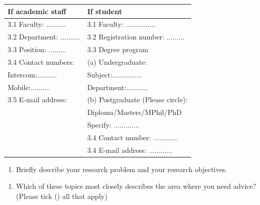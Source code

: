 \documentclass[
  a4paper]{article}
\providecommand{\tightlist}{%
  \setlength{\itemsep}{0pt}\setlength{\parskip}{0pt}}
\begin{document}
\begin{table}[!h]
\center
\begin{tabular}{p{7cm}|p{7.5cm}}
\hline
If academic staff & If student \\ \hline
3.1 Faculty: .......... & 3.1 Faculty: ...............  \\ 
3.2 Department: .......... & 3.2 Registration number: ......... \\ 
3.3 Position: ......... & 3.3 Degree program \\ 
3.4 Contact numbers: & \hspace{0.5cm} (a) Undergraduate: \\ 
\hspace{0.8cm} Intercom:.......... & \hspace{0.8cm} Subject:............... \\ 
\hspace{0.8cm} Mobile:.......... & \hspace{0.8cm} Department:........... \\ 
3.5 E-mail address:  & \hspace{0.5cm} (b) Postgraduate (Please circle): \\ 
 & \hspace{0.8cm} Diploma/Masters/MPhil/PhD \\ 
 & \hspace{0.8cm} Specify: ............. \\ 
  & 3.4 Contact number: ............  \\ 
  & 3.4 E-mail address: ............  \\ \hline
\end{tabular}
\end{table}

\begin{enumerate}
\def\labelenumi{\arabic{enumi}.}
\setcounter{enumi}{3}
\tightlist
\item
  Briefly describe your research problem and your research objectives.
\end{enumerate}

\newpage

\begin{enumerate}
\def\labelenumi{\arabic{enumi}.}
\setcounter{enumi}{4}
\tightlist
\item
  Which of these topics most closely describes the area where you need
  advice? (Please tick (\checkmark) all that apply)
\end{enumerate}
\end{document}
